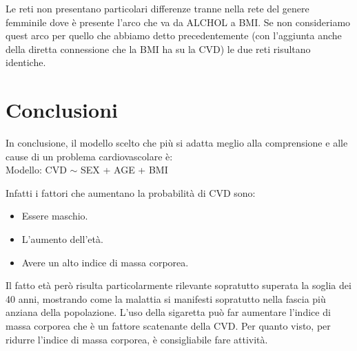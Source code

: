 \documentclass{article}\usepackage[]{graphicx}\usepackage[]{xcolor}
\begin{document}
    Le reti non presentano particolari differenze tranne nella rete del genere 
    femminile dove è presente l'arco che va da ALCHOL a BMI. Se non consideriamo 
    quest arco per quello che abbiamo detto precedentemente (con l'aggiunta
    anche della diretta connessione che la BMI ha su la CVD) le due reti risultano
    identiche.
      
\clearpage


\section{Conclusioni}
  In conclusione, il modello scelto che più si adatta meglio alla comprensione
  e alle cause di un problema cardiovascolare è:\\
  Modello: CVD $\sim$ SEX + AGE + BMI \par
  Infatti i fattori che aumentano la probabilità di CVD sono:
  \begin{itemize}
    \item Essere maschio.
    \item L'aumento dell'età.
    \item Avere un alto indice di massa corporea.
  \end{itemize}
  Il fatto età però risulta particolarmente rilevante sopratutto superata la 
  soglia dei 40 anni, mostrando come la malattia si manifesti sopratutto nella 
  fascia più anziana della popolazione. L'uso della sigaretta può far aumentare 
  l'indice di massa corporea che è un fattore scatenante della CVD. Per quanto
  visto, per ridurre l'indice di massa corporea, è consigliabile fare attività.
  
\end{document}
